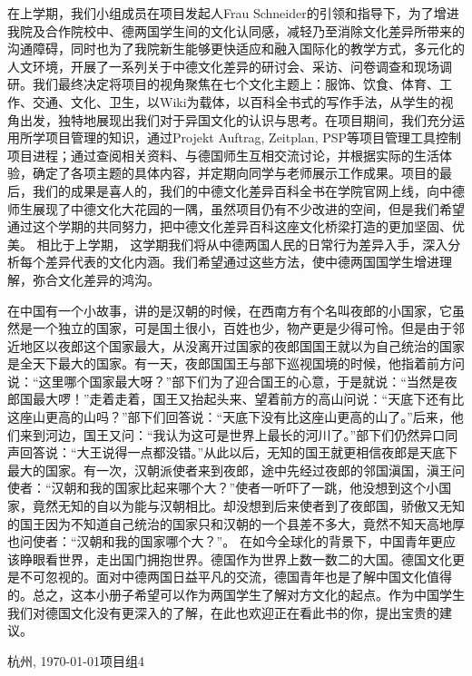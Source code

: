 \par
 在上学期，我们小组成员在项目发起人Frau Schneider的引领和指导下，为了增进我院及合作院校中、德两国学生间的文化认同感，减轻乃至消除文化差异所带来的沟通障碍，同时也为了我院新生能够更快适应和融入国际化的教学方式，多元化的人文环境，开展了一系列关于中德文化差异的研讨会、采访、问卷调查和现场调研。我们最终决定将项目的视角聚焦在七个文化主题上：服饰、饮食、体育、工作、交通、文化、卫生，以Wiki为载体，以百科全书式的写作手法，从学生的视角出发，独特地展现出我们对于异国文化的认识与思考。在项目期间，我们充分运用所学项目管理的知识，通过Projekt Auftrag, Zeitplan, PSP等项目管理工具控制项目进程；通过查阅相关资料、与德国师生互相交流讨论，并根据实际的生活体验，确定了各项主题的具体内容，并定期向同学与老师展示工作成果。项目的最后，我们的成果是喜人的，我们的中德文化差异百科全书在学院官网上线，向中德师生展现了中德文化大花园的一隅，虽然项目仍有不少改进的空间，但是我们希望通过这个学期的共同努力，把中德文化差异百科这座文化桥梁打造的更加坚固、优美。
 相比于上学期， 这学期我们将从中德两国人民的日常行为差异入手，深入分析每个差异代表的文化内涵。我们希望通过这些方法，使中德两国国学生增进理解，弥合文化差异的鸿沟。
 \par
 在中国有一个小故事，讲的是汉朝的时候，在西南方有个名叫夜郎的小国家，它虽然是一个独立的国家，可是国土很小，百姓也少，物产更是少得可怜。但是由于邻近地区以夜郎这个国家最大，从没离开过国家的夜郎国国王就以为自己统治的国家是全天下最大的国家。有一天，夜郎国国王与部下巡视国境的时候，他指着前方问说：“这里哪个国家最大呀？”部下们为了迎合国王的心意，于是就说：“当然是夜郎国最大啰！”走着走着，国王又抬起头来、望着前方的高山问说：“天底下还有比这座山更高的山吗？”部下们回答说：“天底下没有比这座山更高的山了。”后来，他们来到河边，国王又问：“我认为这可是世界上最长的河川了。”部下们仍然异口同声回答说：“大王说得一点都没错。”从此以后，无知的国王就更相信夜郎是天底下最大的国家。有一次，汉朝派使者来到夜郎，途中先经过夜郎的邻国滇国，滇王问使者：“汉朝和我的国家比起来哪个大？”使者一听吓了一跳，他没想到这个小国家，竟然无知的自以为能与汉朝相比。却没想到后来使者到了夜郎国，骄傲又无知的国王因为不知道自己统治的国家只和汉朝的一个县差不多大，竟然不知天高地厚也问使者：“汉朝和我的国家哪个大？”。
 在如今全球化的背景下，中国青年更应该睁眼看世界，走出国门拥抱世界。德国作为世界上数一数二的大国。德国文化更是不可忽视的。面对中德两国日益平凡的交流，德国青年也是了解中国文化值得的。总之，这本小册子希望可以作为两国学生了解对方文化的起点。作为中国学生我们对德国文化没有更深入的了解，在此也欢迎正在看此书的你，提出宝贵的建议。
\vspace{\baselineskip}
\begin{flushright}\noindent
杭州, \today \hfill 项目组4\\
\end{flushright}
